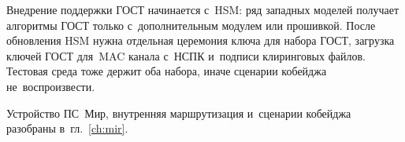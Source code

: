 Внедрение поддержки ГОСТ начинается с~HSM: ряд западных моделей получает
алгоритмы ГОСТ только с~дополнительным модулем или прошивкой.
После обновления HSM нужна отдельная церемония ключа для набора ГОСТ, загрузка
ключей ГОСТ для~MAC канала с~НСПК и~подписи клиринговых файлов.
Тестовая среда тоже держит оба набора, иначе сценарии кобейджа
не~воспроизвести.

Устройство ПС~Мир, внутренняя маршрутизация и~сценарии кобейджа
разобраны в~гл.~\ref{ch:mir}.
